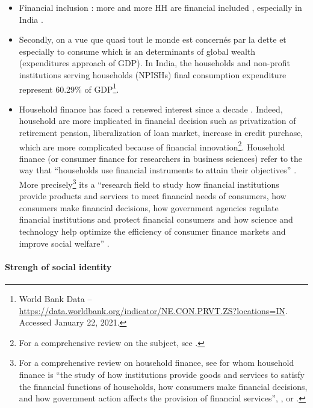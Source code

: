 \documentclass[a4paper, 11pt, onecolumn]{article}
\begin{document}
\begin{itemize}
\item Financial inclusion : more and more HH are financial included \citep{Badarinza2019}, especially in India \citep{Chakravartya2013}. 
\item Secondly, on a vue que quasi tout le monde est concernés par la dette et especially to consume which is an determinants of global wealth (expenditures approach of GDP).
In India, the households and non-profit institutions serving households (NPISHs) final consumption expenditure represent 60.29\% of GDP\footnote{World Bank Data -- \url{https://data.worldbank.org/indicator/NE.CON.PRVT.ZS?locations=IN}. Accessed January 22, 2021.}.
\item Household finance has faced a renewed interest since a decade \citep{Guiso2013}.
Indeed, household are more implicated in financial decision such as privatization of retirement pension, liberalization of loan market, increase in credit purchase, which are more complicated because of financial innovation\footnote{For a comprehensive review on the subject, see \cite{Tufano2003}.}.
Household finance (or consumer finance for researchers in business sciences) refer to the way that ``households use financial instruments to attain their objectives'' \citep{Campbell2006}.
More precisely\footnote{For a comprehensive review on household finance, see \cite{Tufano2009} for whom household finance is ``the study of how institutions provide goods and services to satisfy the financial functions of households, how consumers make financial decisions, and how government action affects the provision of financial services'', \cite{Guiso2013}, or \cite{Xiao2020}.}  its a ``research field to study how financial institutions provide products and services to meet financial needs of consumers, how consumers make financial decisions, how government agencies regulate financial institutions and protect financial consumers and how science and technology help optimize the efficiency of consumer finance markets and improve social welfare'' \citep{Xiao2020}.
\end{itemize}


\paragraph{Strengh of social identity}
\end{document}
